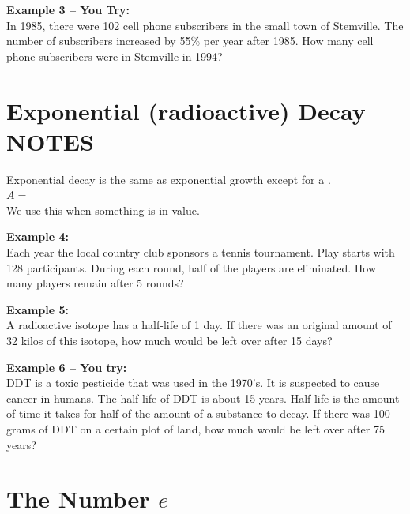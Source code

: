 \documentclass[12pt]{article}
\begin{document}
\vspace{1in}

\textbf{Example 3 -- You Try:}\\
In 1985, there were 102 cell phone subscribers in the small town of Stemville.  The number of subscribers increased by 55\% per year after 1985.  How many cell phone subscribers were in Stemville in 1994?

\pagebreak

\section{Exponential (radioactive) Decay -- NOTES}

Exponential decay is the same as exponential growth except for a \underline{\hspace{5cm}}.\\

$A=$\\

We use this when something is \underline{\hspace{5cm}} in value.\\

\hrulefill

\textbf{Example 4:}\\
Each year the local country club sponsors a tennis tournament.  Play starts with 128 participants.  During each round, half of the players are eliminated.  How many players remain after 5 rounds?\\

\vspace{1in}

\textbf{Example 5:}\\
A radioactive isotope has a half-life of 1 day. If there was an original amount of 32 kilos of this isotope, how much would be left over after 15 days?\\

\vspace{1in}

\textbf{Example 6 -- You try:}\\
DDT is a toxic pesticide that was used in the 1970's. It is suspected to cause cancer in humans.  The half-life of DDT is about 15 years.  Half-life is the amount of time it takes for half of the amount of a substance to decay. If there was 100 grams of DDT on a certain plot of land, how much would be left over after 75 years?

\section{The Number $e$}
\end{document}
